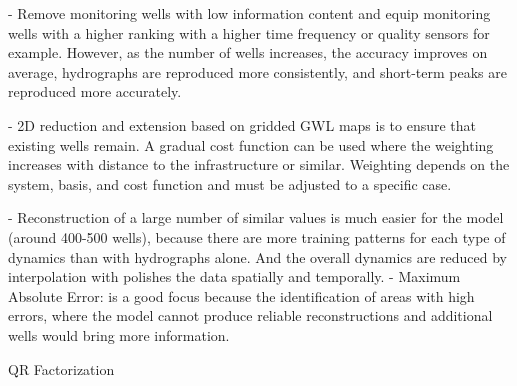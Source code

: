 

- Remove monitoring wells with low information content and equip monitoring wells with a higher ranking with a higher time frequency or quality sensors for example. However, as the number of wells increases, the accuracy improves on average, hydrographs are reproduced more consistently, and short-term peaks are reproduced more accurately. 



- 2D reduction and extension based on gridded GWL maps is to ensure that existing wells remain. A gradual cost function can be used where the weighting increases with distance to the infrastructure or similar. Weighting depends on the system, basis, and cost function and must be adjusted to a specific case. 

- Reconstruction of a large number of similar values is much easier for the model (around 400-500 wells), because there are more training patterns for each type of dynamics than with hydrographs alone. And the overall dynamics are reduced by interpolation with polishes the data spatially and temporally. 
- Maximum Absolute Error: is a good focus because the identification of areas with high errors, where the model cannot produce reliable reconstructions and additional wells would bring more information. 

QR Factorization


